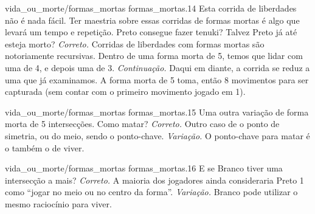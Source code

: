 \problemAnswerDiagram
  {vida_ou_morte/formas_mortas}
  {formas_mortas.14}
  {Esta corrida de liberdades não é nada fácil. Ter maestria sobre essas corridas de formas mortas é algo que levará um tempo e repetição. Preto consegue fazer tenuki? Talvez Preto já até esteja morto?}
  {\emph{Correto.} Corridas de liberdades com formas mortas são notoriamente recursivas. Dentro de uma forma morta de 5, temos que lidar com uma de 4, e depois uma de 3.}
  {\emph{Continuação.} Daqui em diante, a corrida se reduz a uma que já examinamos. A forma morta de 5 toma, então 8 movimentos para ser capturada (sem contar com o primeiro movimento jogado em 1).}

\problemAnswerDiagram
  {vida_ou_morte/formas_mortas}
  {formas_mortas.15}
  {Uma outra variação de forma morta de 5 intersecções. Como matar?}
  {\emph{Correto.} Outro caso de o ponto de simetria, ou do meio, sendo o ponto-chave.}
  {\emph{Variação.} O ponto-chave para matar é o também o de viver.}

\problemAnswerDiagram
  {vida_ou_morte/formas_mortas}
  {formas_mortas.16}
  {E se Branco tiver uma intersecção a mais?}
  {\emph{Correto.} A maioria dos jogadores ainda consideraria Preto 1 como ``jogar no meio ou no centro da forma''.}
  {\emph{Variação.} Branco pode utilizar o mesmo raciocínio para viver.}